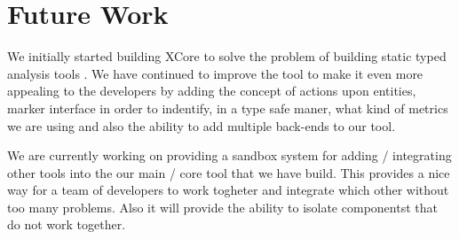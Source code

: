 \section{Future Work}

        We initially started building XCore to solve the problem of building static typed analysis tools \cite{oldThesis}. We have continued
to improve the tool to make it even more appealing to the developers by adding the concept of actions upon entities, marker interface in order
to indentify, in a type safe maner, what kind of metrics we are using and also the ability to add multiple back-ends to our tool.
        
        We are currently working on providing a sandbox system for adding / integrating other tools into the our main / core tool that we have build. 
This provides a nice way for a team of developers to work togheter and integrate which other without too many problems. Also it will provide the ability
to isolate componentst that do not work together. 
